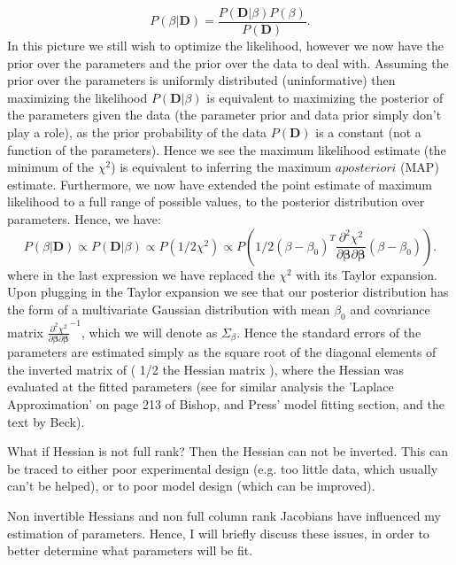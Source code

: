  \begin{equation}
 P(\beta|\mathbf{D}) =\frac{ P(\mathbf{D}| \beta)P(\beta)}{P(\mathbf{D})} .
 \end{equation}
 In this picture we still wish to optimize the likelihood, however we now have the prior over the parameters and the prior over the data to deal with.  Assuming the prior over the parameters is uniformly distributed (uninformative) then maximizing the likelihood $P(\mathbf{D}| \beta)$ is equivalent to maximizing the posterior of the parameters given the data (the parameter prior and data prior simply don't play a role), as the prior probability of the data $P(\mathbf{D})$ is a constant (not a function of the parameters).  Hence we see the maximum likelihood estimate (the minimum of the $\chi^2$) is equivalent to inferring the maximum $a posteriori$ (MAP) estimate.  Furthermore, we now have extended the point estimate of maximum likelihood to a full range of possible values, to the posterior distribution over parameters.  Hence, we have:
 \begin{equation}
 P(\beta|\mathbf{D}) \propto P(\mathbf{D}| \beta) \propto P(1/2\chi^2) \propto P(1/2(\beta-\beta_0)^T \frac{\partial^2{\chi^2}}{\partial{\mathbf{\beta}}\partial{\mathbf{\beta}}}(\beta-\beta_0)) .
 \end{equation}
 where in the last expression we have replaced the $\chi^2$ with its Taylor expansion.  Upon plugging in the Taylor expansion we see that our posterior distribution has the form of a multivariate Gaussian distribution with mean $\beta_0$ and covariance matrix $\frac{\partial^2{\chi^2}}{\partial{\mathbf{\beta}}\partial{\mathbf{\beta}}}^{-1}$, which we will denote as $\Sigma_{\beta}$.  Hence the standard errors of the parameters are estimated simply as the square root of the diagonal elements of the inverted matrix of ( 1/2 the Hessian matrix ), where the Hessian was evaluated at the fitted parameters (see for similar analysis the 'Laplace Approximation' on page 213 of Bishop\cite{bishop}, and Press' model fitting section\cite{press_etal:1996}, and the text by Beck\cite{beck}).
 
 What if Hessian is not full rank?  Then the Hessian can not be inverted.  This can be traced to either poor experimental design (e.g. too little data, which usually can't be helped), or to poor model design (which can be improved).  
 
 Non invertible Hessians and non full column rank Jacobians have influenced my estimation of parameters.  Hence, I will briefly discuss these issues, in order to better determine what parameters will be fit.
 
